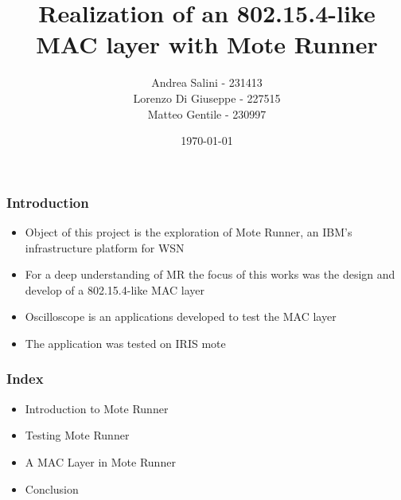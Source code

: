 \documentclass[12pt, compress]{beamer}
\title{Realization of an 802.15.4-like MAC layer with Mote Runner}
\subtitle{}
\date{\today}
\author{Andrea Salini - 231413\\Lorenzo Di Giuseppe - 227515\\Matteo Gentile - 230997}
\institute{DISIM - Università degli Studi dell’Aquila}
\begin{document}
  \maketitle
  
\begin{frame}[fragile]
  \frametitle{Introduction}
  \begin{itemize}
    \item Object of this project is the exploration of Mote Runner, an IBM’s infrastructure platform for WSN
    \item For a deep understanding of MR the focus of this works was the design and develop of a 802.15.4-like MAC layer
    \item Oscilloscope is an applications developed to test the MAC layer
    \item The application was tested on IRIS mote
  \end{itemize}
\end{frame}

\begin{frame}[fragile]
  \frametitle{Index}
  \begin{itemize}
    \item Introduction to Mote Runner
    \item Testing Mote Runner
    \item A MAC Layer in Mote Runner
    \item Conclusion
  \end{itemize}
\end{frame}






\end{document}

